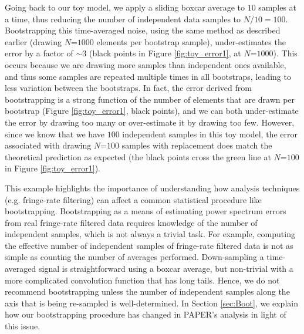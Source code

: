 \documentclass[preprint2,numberedappendix,tighten]{aastex6}  %
\begin{document}
Going back to our toy model, we apply a sliding boxcar average to $10$ samples at a time, thus reducing the number of 
independent data samples to $N/10 = 100$. Bootstrapping this time-averaged noise, using the same method as described 
earlier (drawing $N$=$1000$ elements per bootstrap sample), under-estimates the error by a factor of $\sim3$ (black points in Figure \ref{fig:toy_error1}, at $N$=$1000$). This occurs 
because we are drawing more samples than independent ones available, and thus some samples are repeated multiple times 
in all bootstraps, leading to less variation between the bootstraps. In fact, the error derived from bootstrapping is a strong 
function of the number of elements that are drawn per bootstrap (Figure \ref{fig:toy_error1}, black points), and we can both 
under-estimate the error by drawing too many or over-estimate it by drawing too few. However, since we know that we have $100$ 
independent samples in this toy model, the error associated with drawing $N$=$100$ samples with replacement does match the theoretical prediction 
as expected (the black points cross the green line at $N$=$100$ in Figure \ref{fig:toy_error1}).

This example highlights the importance of understanding how analysis techniques (e.g. fringe-rate filtering) can affect a 
common statistical procedure like bootstrapping. Bootstrapping as a means of estimating power spectrum errors from real 
fringe-rate filtered data requires knowledge of the number of independent samples, which is not always a trivial task. For 
example, computing the effective number of independent samples of fringe-rate filtered data is not as simple as counting the 
number of averages performed. Down-sampling a time-averaged signal is straightforward using a boxcar average, but non-trivial with a more complicated convolution function that has long tails. Hence, we do not recommend bootstrapping unless the 
number of independent samples along the axis that is being re-sampled is well-determined. In Section \ref{sec:Boot}, we explain how our bootstrapping procedure has changed in PAPER's analysis in light of this issue. 
\end{document}
